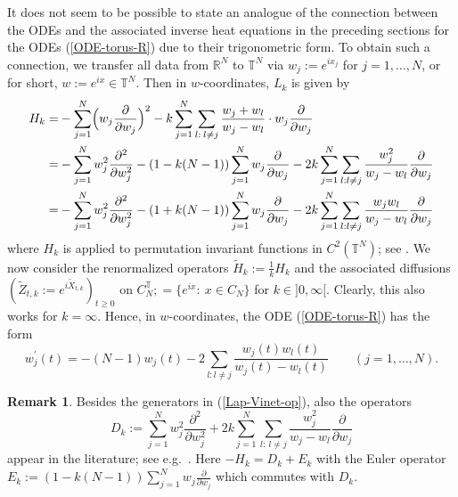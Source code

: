 \documentclass[reqno]{amsart}
\theoremstyle{plain}
\theoremstyle{definition}
\newtheorem{remark}[theorem]{Remark}
\numberwithin{equation}{section}
\begin{document}
 It does not seem to be possible to state an analogue of the connection between the ODEs and the associated  inverse heat equations
 in the preceding sections for the ODEs (\ref{ODE-torus-R}) due to their trigonometric form. To obtain such a connection,
 we 
 transfer all data from $\mathbb R^N$ to  $\mathbb T^N$ via $w_j:=e^{ix_j}$ for $j=1,\ldots,N$, or for short,
  $w:=e^{ix}\in \mathbb T^N$. Then in $w$-coordinates,  $L_k$ is given by 
    \begin{align}\label{Lap-Vinet-op}
      H_k =&  -\sum_{j=1}^N\Bigl( w_j\frac{\partial}{\partial w_j}\Bigr)^2-
      k\sum_{j=1}^N \sum_{l:\> l\ne j}\frac{w_j+w_l}{w_j-w_l}\cdot w_j\frac{\partial}{\partial w_j}\\
      =& -\sum_{j=1}^N w_j^2 \frac{\partial^2}{\partial w_j^2} -(1-k(N-1))\sum_{j=1}^N w_j\frac{\partial}{\partial w_j}
-2k\sum_{j=1}^N \sum_{l:l\ne j}
\frac{ w_j^2}{w_j-w_l}\frac{\partial}{\partial w_j}\notag\\
=& -\sum_{j=1}^N w_j^2 \frac{\partial^2}{\partial w_j^2} -(1+k(N-1))\sum_{j=1}^N w_j\frac{\partial}{\partial w_j}
-2k\sum_{j=1}^N \sum_{l:l\ne j}
\frac{ w_jw_l}{w_j-w_l}\frac{\partial}{\partial w_j}\notag
    \end{align}
   where $H_k$ is applied to  permutation invariant functions in
   $C^2(\mathbb T^N)$; see  \cite{LV, RV2}.
We now consider
  the renormalized operators $\tilde  H_k:=\frac{1}{k} H_k$ and the associated diffusions
  $(\tilde Z_{t,k}:=e^{i\widetilde X_{t,k}})_{t\ge0}$
  on $C_N^{\mathbb T};=\{e^{ix}:\> x\in C_N\}$  for $k\in]0,\infty[$. Clearly, this  also works for $k=\infty$. Hence,
                   in $w$-coordinates, the ODE (\ref{ODE-torus-R}) 
                   has the form
    \begin{equation}\label{ODE-torus}
      w_j^\prime(t)= -(N-1) w_j(t)
-2\sum_{l:l\ne j}
\frac{ w_j(t)w_l(t)}{w_j(t)-w_l(t)}
\quad\quad(j=1,\ldots,N).
    \end{equation}               


\begin{remark}  Besides the generators in  (\ref{Lap-Vinet-op}), also the operators
  \begin{equation}
    D_k:= \sum_{j=1}^N w_j^2 \frac{\partial^2}{\partial w_j^2}     +2k\sum_{j=1}^N \sum_{l: \> l\ne j}
    \frac{ w_j^2}{w_j-w_l}\frac{\partial}{\partial w_j}
    \end{equation}
appear in the literature; see e.g.~\cite{F, St, OO}.
Here
$-H_k=D_k+E_k$ with the Euler operator 
$E_k:=(1-k(N-1))\sum_{j=1}^N w_j\frac{\partial}{\partial w_j}$
which commutes with $D_k$.
\end{remark}
     
\end{document}
